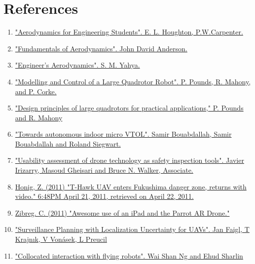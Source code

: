 \documentclass[12pt]{article}
\begin{document}
\section{References}
\begin{enumerate}
    \item \href{https://books.google.co.in/books?id=4YCThwzeTBQC&redir_esc=y}{"Aerodynamics for Engineering Students". E. L. Houghton, P.W.Carpenter.}
    \item \href{https://books.google.co.in/books/about/Fundamentals_of_Aerodynamics.html?id=CaBTAAAAMAAJ}{"Fundamentals of Aerodynamics". John David Anderson.}
    \item \href{https://books.google.co.in/books/about/Fundamentals_of_Compressible_Flow.html?id=_NCz9iZIugYC}{"Engineer's Aerodynamics". S. M. Yahya.}
    \item \href{http://eprints.qut.edu.au/33732/1/cep2009_modelling_and_control_paper_sub_final.pdf}{"Modelling and Control of a Large Quadrotor Robot". P. Pounds, R. Mahony, and P. Corke.}
    \item \href{http://ieeexplore.ieee.org/iel5/5076472/5152175/05152390.pdf?arnumber=5152390}{"Design principles of large quadrotors for practical applications," P. Pounds and R. Mahony}
    \item \href{https://www.researchgate.net/publication/220474158_Towards_autonomous_indoor_micro_VTOL}{"Towards autonomous indoor micro VTOL". Samir Bouabdallah, Samir Bouabdallah and Roland Siegwart.}
    \item \href{http://www.itcon.org/cgi-bin/works/Show?2012_12}{"Usability assessment of drone technology as safety inspection tools". Javier Irizarry, Masoud Gheisari and Bruce N. Walker, Associate.}
    \item \href{http://www.engadget.com/2011/04/21/t-hawk-uav-enters-fukushima-danger-zone-returns-with-video/}{Honig, Z. (2011) "T-Hawk UAV enters Fukushima danger zone, returns with video." 6:48PM April 21, 2011, retrieved on April 22, 2011.}
    \item \href{http://9to5mac.com/2011/06/15/awesome-use-of-an-ipad-and-the-parrot-ar-drone/}{Zibreg. C. (2011) "Awesome use of an iPad and the Parrot AR Drone."} 
    \item \href{http://robotics.felk.cvut.cz/faiglj/thesis/papers/icr10.pdf}{"Surveillance Planning with Localization Uncertainty for UAVs". Jan Faigl,  T Krajnık,  V Vonásek,  L Preucil} 
    \item \href{http://ieeexplore.ieee.org/xpl/articleDetails.jsp?reload=true&arnumber=6005280}{"Collocated interaction with flying robots". Wai Shan Ng and Ehud Sharlin} 

\end{enumerate}
\end{document}
